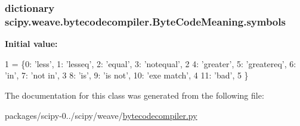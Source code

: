 \subsubsection[{symbols}]{\setlength{\rightskip}{0pt plus 5cm}dictionary scipy.\+weave.\+bytecodecompiler.\+Byte\+Code\+Meaning.\+symbols\hspace{0.3cm}{\ttfamily [static]}}\label{classscipy_1_1weave_1_1bytecodecompiler_1_1ByteCodeMeaning_a87cd48ab6f941c028ddca2bb15820ba3}
{\bfseries Initial value\+:}
\begin{DoxyCode}
1 = \{0: \textcolor{stringliteral}{'less'}, 1: \textcolor{stringliteral}{'lesseq'}, 2: \textcolor{stringliteral}{'equal'}, 3: \textcolor{stringliteral}{'notequal'},
2                 4: \textcolor{stringliteral}{'greater'}, 5: \textcolor{stringliteral}{'greatereq'}, 6: \textcolor{stringliteral}{'in'}, 7: \textcolor{stringliteral}{'not in'},
3                 8: \textcolor{stringliteral}{'is'}, 9: \textcolor{stringliteral}{'is not'}, 10: \textcolor{stringliteral}{'exe match'},
4                 11: \textcolor{stringliteral}{'bad'},
5                \}
\end{DoxyCode}


The documentation for this class was generated from the following file\+:\begin{DoxyCompactItemize}
\item 
packages/scipy-\/0../scipy/weave/\hyperlink{bytecodecompiler_8py}{bytecodecompiler.\+py}\end{DoxyCompactItemize}
